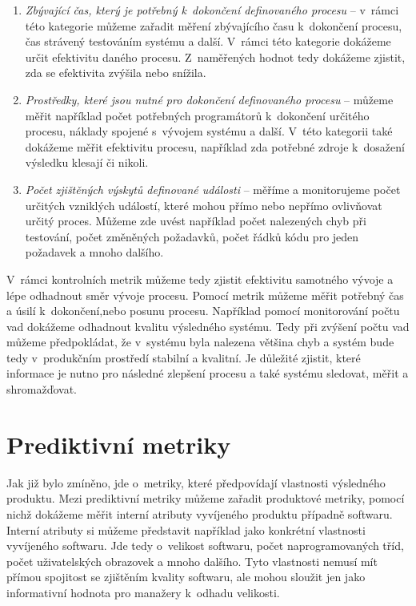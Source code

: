 \documentclass[czech,master]{diploma}
\begin{document}
\begin{enumerate}
\item \textit{Zbývající čas, který je potřebný k~dokončení definovaného procesu} -- v~rámci této kategorie můžeme zařadit měření zbývajícího času k~dokončení procesu, čas strávený testováním systému a další. V~rámci této kategorie dokážeme určit efektivitu daného procesu. Z~naměřených hodnot tedy dokážeme zjistit, zda se efektivita zvýšila nebo snížila.

\item \textit{Prostředky, které jsou nutné pro dokončení definovaného procesu} -- můžeme měřit například počet potřebných programátorů k~dokončení určitého procesu, náklady spojené s~vývojem systému a další. V~této kategorii také dokážeme měřit efektivitu procesu, například zda potřebné zdroje k~dosažení výsledku klesají či nikoli.

\item \textit{Počet zjištěných výskytů definované události} -- měříme a monitorujeme počet určitých vzniklých událostí, které mohou přímo nebo nepřímo ovlivňovat určitý proces. Můžeme zde uvést například počet nalezených chyb při testování, počet změněných požadavků, počet řádků kódu pro jeden požadavek a mnoho dalšího.

\end{enumerate}

V~rámci kontrolních metrik můžeme tedy zjistit efektivitu samotného vývoje a lépe odhadnout směr vývoje procesu. Pomocí metrik můžeme měřit potřebný čas a úsilí k~dokončení,nebo posunu procesu. Například pomocí monitorování počtu vad dokážeme odhadnout kvalitu výsledného systému. Tedy při zvýšení počtu vad můžeme předpokládat, že v~systému byla nalezena většina chyb a systém bude tedy v~produkčním prostředí stabilní a kvalitní. Je důležité zjistit, které informace je nutno pro následné zlepšení procesu a také systému sledovat, měřit a shromažďovat.

\section{Prediktivní metriky}
Jak již bylo zmíněno, jde o~metriky, které předpovídají vlastnosti výsledného produktu. Mezi prediktivní metriky můžeme zařadit produktové metriky, pomocí nichž dokážeme měřit interní atributy vyvíjeného produktu případně softwaru. Interní atributy si můžeme představit například jako konkrétní vlastnosti vyvíjeného softwaru. Jde tedy o~velikost softwaru, počet naprogramovaných tříd, počet uživatelských obrazovek a mnoho dalšího. Tyto vlastnosti nemusí mít přímou spojitost se zjištěním kvality softwaru, ale mohou sloužit jen jako informativní hodnota pro manažery k~odhadu velikosti.
\end{document}
